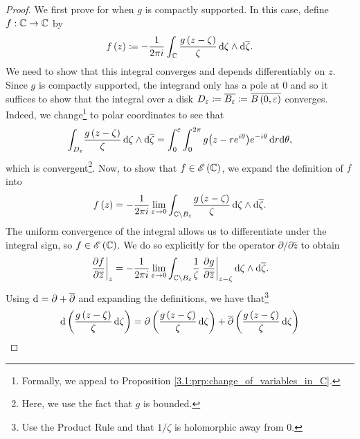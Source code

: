 \documentclass[../Moduli_Spaces_of_Riemann_Surfaces.tex]{subfiles}
\begin{document}
    \begin{proof}
        We first prove for when $g$ is compactly supported. In this case, define $f:\mathbb{C}\to\mathbb{C}$ by
        \begin{equation*}
            f\left(z\right)\coloneqq-\frac{1}{2\pi i}\int_{\mathbb{C}}\frac{g\left(z-\zeta\right)}{\zeta}\,\mathrm{d}\zeta\wedge\mathrm{d}\overline{\zeta}.
        \end{equation*}
        We need to show that this integral converges and depends differentiably on $z$. Since $g$ is compactly supported, the integrand only has a pole at $0$ and so it suffices to show that the integral over a disk $D_\varepsilon\coloneqq\overline{B_\varepsilon}\coloneqq\overline{B\left(0,\varepsilon\right)}$ converges. Indeed, we change\footnote{Formally, we appeal to Proposition \ref{3.1:prp:change_of_variables_in_C}.} to polar coordinates to see that
        \begin{equation*}
            \int_{ D_\varepsilon}\!\frac{g\left(z-\zeta\right)}{\zeta}\,\mathrm{d}\zeta\wedge\mathrm{d}\overline{\zeta}=\int_{0}^{\varepsilon}\int_{0}^{2\pi}g\big(z-re^{i\theta}\big)e^{-i\theta}\,\mathrm{d} r\mathrm{d}\theta,
        \end{equation*}
        which is convergent\footnote{Here, we use the fact that $g$ is bounded.}. Now, to show that $f\in\mathscr{E}\left(\mathbb{C}\right)$, we expand the definition of $f$ into
        \begin{equation*}
            f\left(z\right)=-\frac{1}{2\pi i}\lim\limits_{\varepsilon\to0}\int_{\mathbb{C}\setminus B_\varepsilon}\!\frac{g\left(z-\zeta\right)}{\zeta}\,\mathrm{d}\zeta\wedge\mathrm{d}\overline{\zeta}.
        \end{equation*}
        The uniform convergence of the integral allows us to differentiate under the integral sign, so $f\in\mathscr{E}\left(\mathbb{C}\right)$. We do so explicitly for the operator $\partial/\partial\bar{z}$ to obtain
        \begin{equation*}
            \left.\frac{\partial f}{\partial\overline{z}}\right|_z=-\frac{1}{2\pi i}\lim\limits_{\varepsilon\to0}\int_{\mathbb{C}\setminus B_\varepsilon}\!\frac{1}{\zeta}\left.\frac{\partial g}{\partial\overline{z}}\right|_{z-\zeta}\mathrm{d}\zeta\wedge\mathrm{d}\overline{\zeta}.
        \end{equation*}
        Using $\mathrm{d}=\partial+\overline{\partial}$ and expanding the definitions, we have that\footnote{Use the Product Rule and that $1/\zeta$ is holomorphic away from $0$.}
        \begin{equation*}
            \begin{aligned}
                \d\l(\frac{g\l(z-\zeta\r)}{\zeta}\,\d\zeta\r)&=\partial\l(\frac{g\l(z-\zeta\r)}{\zeta}\,\d\zeta\r)+\bar{\partial}\l(\frac{g\l(z-\zeta\r)}{\zeta}\,\d\zeta\r) \\

\end{aligned}
\end{equation*}
\end{proof}
\end{document}
